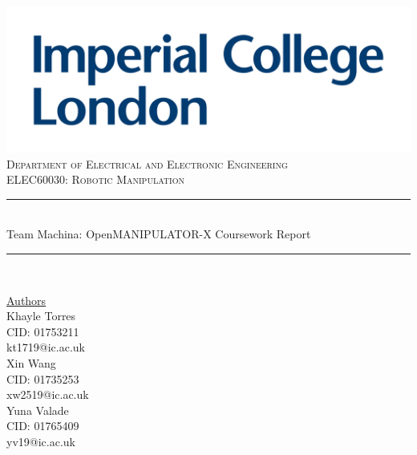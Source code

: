 \documentclass[9pt, a4paper]{article}
\begin{document}
\begin{titlepage}
	\newcommand{\HRule}{\rule{\linewidth}{0.5mm}}
    \includegraphics[scale=0.1]{./Images/Imperial_Logo.jpg} 
    \\
    \center 
	\textsc{\large Department of Electrical and Electronic Engineering }\\[0.5cm] 
	\textsc{\normalsize ELEC60030: Robotic Manipulation}\\[0.5cm] 
    
	\HRule \\[0.4cm]
	Team Machina: OpenMANIPULATOR-X Coursework Report
    \HRule \\[1.5cm]
     
    \begin{center}
		\underline{Authors}\\[0.5cm] 
        Khayle Torres \\ CID: 01753211 \\ kt1719@ic.ac.uk \\ [0.5cm]

        Xin Wang \\ CID: 01735253 \\ xw2519@ic.ac.uk \\ [0.5cm]
        
        Yuna Valade \\ CID: 01765409 \\ yv19@ic.ac.uk \\ [0.5cm]

	\end{center} \large

    \vfill 
    \makeatletter
    \@date 
    \makeatother
\end{titlepage}

\renewcommand{\baselinestretch}{0.75}\normalsize
\tableofcontents
\renewcommand{\baselinestretch}{1.0}\normalsize

\pagebreak
\end{document}
